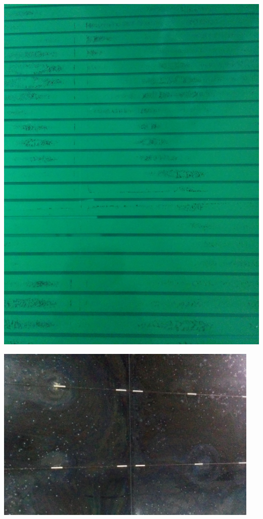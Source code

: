 \noindent
\begin{minipage}[th!]{1\textwidth}
	\centering
	\noindent
	\begin{minipage}[th!]{0.48\textwidth}
		\noindent
		\centering
		\begin{minipage}[th!]{1\textwidth}
			\noindent
			\centering
			\includegraphics[width=1\textwidth]{GLA/peinture.jpg}
		\end{minipage}%
		\renewcommand\thesubfigure{\alph{subfigure}}
		\label{peinture}
	\end{minipage}%
	\hfill
	\begin{minipage}[th!]{0.48\textwidth}
		\noindent
		\centering
		\begin{minipage}[th!]{1\textwidth}
			\noindent
			\centering
			\includegraphics[width=0.95\textwidth]{GLA/perle.jpg}

\end{minipage}
\end{minipage}
\end{minipage}
